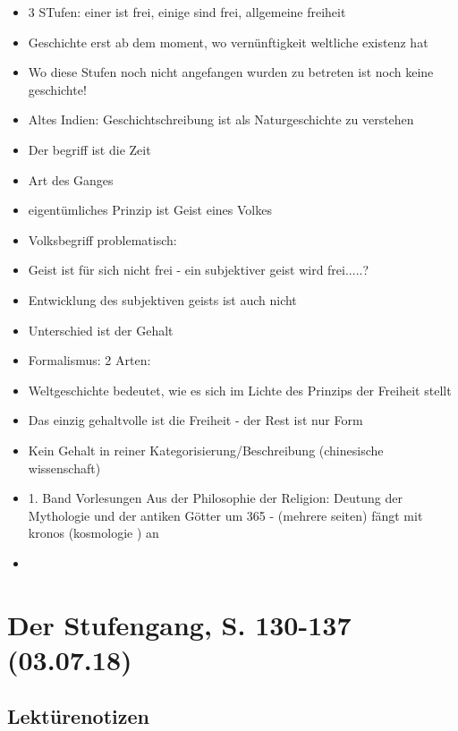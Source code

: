 \documentclass[emulatestandardclasses]{scrartcl}
\begin{document}
\begin{itemize}
  \item 3 STufen: einer ist frei, einige sind frei, allgemeine freiheit
  \item Geschichte erst ab dem moment, wo vernünftigkeit weltliche existenz hat
  \item Wo diese Stufen noch nicht angefangen wurden zu betreten ist noch keine geschichte!
  \item Altes Indien: Geschichtschreibung ist als Naturgeschichte zu verstehen
  \item Der begriff ist die Zeit
  \item Art des Ganges
  \item eigentümliches Prinzip ist Geist eines Volkes
  \item Volksbegriff problematisch: 
  \item Geist ist für sich nicht frei - ein subjektiver geist wird frei.....?
  \item Entwicklung des subjektiven geists ist auch nicht 
  \item Unterschied ist der Gehalt
  \item Formalismus: 2 Arten: 
  \item Weltgeschichte bedeutet, wie es sich im Lichte des Prinzips der Freiheit stellt
  \item Das einzig gehaltvolle ist die Freiheit - der Rest ist nur Form
  \item Kein Gehalt in reiner Kategorisierung/Beschreibung (chinesische wissenschaft)
  \item 1. Band Vorlesungen Aus der Philosophie der Religion: Deutung der Mythologie und der antiken Götter um 365 - (mehrere seiten) fängt mit kronos (kosmologie ) an
  \item 
\end{itemize}


\section{Der Stufengang, S. 130-137\\(03.07.18)}

\subsection{Lektürenotizen}
\end{document}
